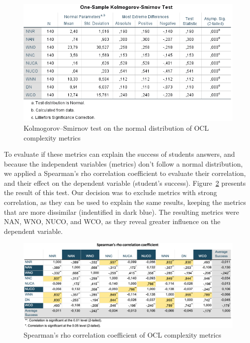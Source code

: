 \begin{figure}[ht]
\centering
\includegraphics[width=1\textwidth]{Chapters/figures/6_Results/Section2/01_KS_OCLmetrics}
\caption{Kolmogorov–Smirnov test on the normal distribution of OCL complexity metrics}
\label{fig:02_ks_oclmetrics}
\end{figure}

To evaluate if these metrics can explain the success of students answers, and because the independent variables (metrics) don't follow a normal distribution, we applied a Spearman's rho correlation coefficient to evaluate their correlation, and their effect on the dependent variable (student's success). Figure~\ref{fig:01_sr_oclmetrics} presents the result of this test. Our decision was to exclude metrics with strong correlation, as they can be used to explain the same results, keeping the metrics that are more dissimilar (indentified in dark blue). The resulting metrics were NAN, WNO, NUCO, and WCO, as they reveal greater influence on the dependent variable.

\begin{figure}[ht]
\centering
\includegraphics[width=1\textwidth]{Chapters/figures/6_Results/Section2/01_SR_OCLmetrics}
\caption{Spearman's rho correlation coefficient of OCL complexity metrics}
\label{fig:01_sr_oclmetrics}
\end{figure}

